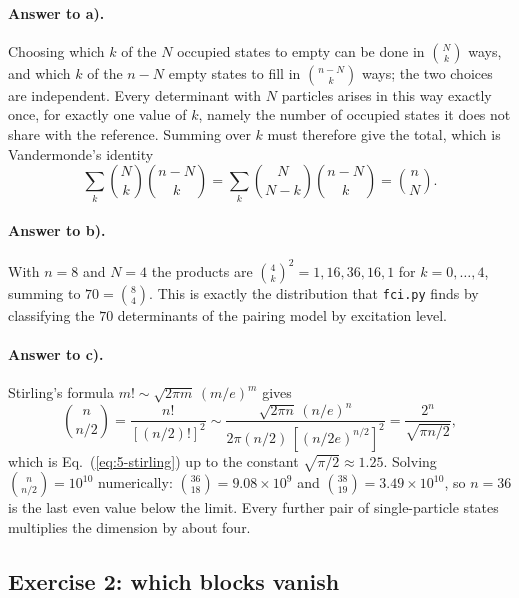 \paragraph{Answer to a).}
Choosing which $k$ of the $N$ occupied states to empty can be done in
$\binom{N}{k}$ ways, and which $k$ of the $n-N$ empty states to fill in
$\binom{n-N}{k}$ ways; the two choices are independent.  Every determinant
with $N$ particles arises in this way exactly once, for exactly one value of
$k$, namely the number of occupied states it does not share with the
reference.  Summing over $k$ must therefore give the total, which is
Vandermonde's identity
\begin{equation}
  \sum_k\binom{N}{k}\binom{n-N}{k}
  = \sum_k\binom{N}{N-k}\binom{n-N}{k} = \binom{n}{N}.
  \label{eq:5-exa1}
\end{equation}

\paragraph{Answer to b).}
With $n=8$ and $N=4$ the products are $\binom{4}{k}^2 = 1,16,36,16,1$ for
$k=0,\dots,4$, summing to $70=\binom{8}{4}$.  This is exactly the distribution
that \texttt{fci.py} finds by classifying the $70$ determinants of the pairing
model by excitation level.

\paragraph{Answer to c).}
Stirling's formula $m!\sim\sqrt{2\pi m}\,(m/e)^m$ gives
\begin{equation}
  \binom{n}{n/2}
  = \frac{n!}{[(n/2)!]^2}
  \sim \frac{\sqrt{2\pi n}\,(n/e)^n}
            {2\pi (n/2)\,\left[(n/2e)^{n/2}\right]^2}
  = \frac{2^{n}}{\sqrt{\pi n/2}} ,
  \label{eq:5-exa2}
\end{equation}
which is Eq.~(\ref{eq:5-stirling}) up to the constant $\sqrt{\pi/2}\approx
1.25$.  Solving $\binom{n}{n/2}=10^{10}$ numerically: $\binom{36}{18}=
9.08\times10^{9}$ and $\binom{38}{19}=3.49\times10^{10}$, so $n=36$ is the
last even value below the limit.  Every further pair of single-particle
states multiplies the dimension by about four.

\subsection*{Exercise 2: which blocks vanish}
\label{ex:5-blocks}

